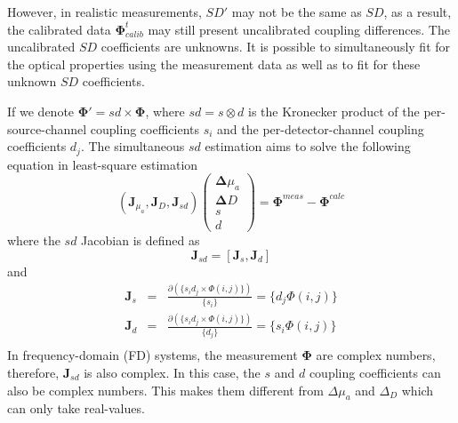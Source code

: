 \documentclass{article}
\begin{document}
However, in realistic measurements, $SD'$ may not be the same as $SD$, as a result, the calibrated data $\mathbf{\Phi}^{t}_{calib}$ may still present uncalibrated coupling differences. The uncalibrated $SD$ coefficients are unknowns. It is possible to simultaneously fit for the optical properties using the measurement data as well as to fit for these unknown $SD$ coefficients.

If we denote $\mathbf{\Phi}'=sd\times\mathbf{\Phi}$, where $sd=s\otimes d$ is the Kronecker product of the per-source-channel coupling coefficients $s_i$ and the per-detector-channel coupling coefficients $d_j$. The simultaneous $sd$ estimation aims to solve the following equation in least-square estimation
\begin{equation}
\left(\mathbf{J}_{\mu_a},\mathbf{J}_{D},\mathbf{J}_{sd}\right)\left(
\begin{array}{c}
\boldsymbol{\Delta}{\mu_a}\\
\boldsymbol{\Delta}{D} \\
s\\d
\end{array}
\right)=\boldsymbol{\Phi}^{meas}-\boldsymbol{\Phi}^{calc}
\end{equation}
where the $sd$ Jacobian is defined as
\begin{equation}\label{eq:Jsd}
\mathbf{J}_{sd}=\left[\mathbf{J}_{s}, \mathbf{J}_{d}\right]
\end{equation}
and
\begin{eqnarray}\label{eq:JsJd}
\mathbf{J}_{s} &=& \frac{\partial(\{s_id_j\times\Phi(i,j)\})}{\{s_i\}}=\{d_j\Phi(i,j)\}\\
\mathbf{J}_{d} &=& \frac{\partial(\{s_id_j\times\Phi(i,j)\})}{\{d_j\}}=\{s_i\Phi(i,j)\}\\
\end{eqnarray}
In frequency-domain (FD) systems, the measurement $\mathbf\Phi$ are complex numbers, therefore, $\mathbf{J}_{sd}$ is also complex. In this case, the $s$ and $d$ coupling coefficients can also be complex numbers. This makes them different from $\Delta\mu_a$ and $\Delta_D$ which can only take real-values.
\end{document}

